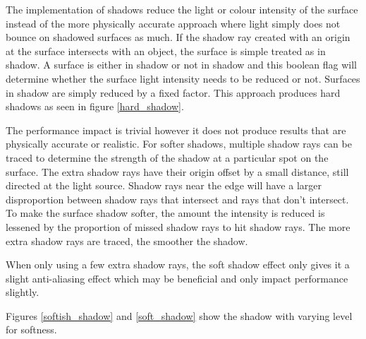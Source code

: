 \documentclass[final]{cmpreport}
\begin{document}
The implementation of shadows reduce the light or colour intensity of the surface instead of the more physically accurate approach where light simply does not bounce on shadowed surfaces as much. If the shadow ray created with an origin at the surface intersects with an object, the surface is simple treated as in shadow. A surface is either in shadow or not in shadow and this boolean flag will determine whether the surface light intensity needs to be reduced or not. Surfaces in shadow are simply reduced by a fixed factor. This approach produces hard shadows as seen in figure \ref{hard_shadow}.

The performance impact is trivial however it does not produce results that are physically accurate or realistic. For softer shadows, multiple shadow rays can be traced to determine the strength of the shadow at a particular spot on the surface. The extra shadow rays have their origin offset by a small distance, still directed at the light source. Shadow rays near the edge will have a larger disproportion between shadow rays that intersect and rays that don't intersect. To make the surface shadow softer, the amount the intensity is reduced is lessened by the proportion of missed shadow rays to hit shadow rays. The more extra shadow rays are traced, the smoother the shadow.

When only using a few extra shadow rays, the soft shadow effect only gives it a slight anti-aliasing effect which may be beneficial and only impact performance slightly.

Figures \ref{softish_shadow} and \ref{soft_shadow} show the shadow with varying level for softness.
\end{document}
